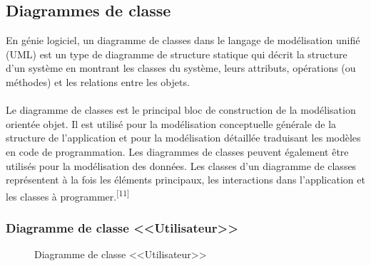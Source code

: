 \documentclass[12pt]{report}
\begin{document}
\newpage

\subsection{Diagrammes de classe}

En génie logiciel, un diagramme de classes dans le langage de modélisation unifié (UML) est un type de diagramme de structure statique qui décrit la structure d'un système en montrant les classes du système, leurs attributs, opérations (ou méthodes) et les relations entre les objets.
\\\\
Le diagramme de classes est le principal bloc de construction de la modélisation orientée objet. Il est utilisé pour la modélisation conceptuelle générale de la structure de l'application et pour la modélisation détaillée traduisant les modèles en code de programmation. Les diagrammes de classes peuvent également être utilisés pour la modélisation des données. Les classes d'un diagramme de classes représentent à la fois les éléments principaux, les interactions dans l'application et les classes à programmer.\textsuperscript{[11]}

\vspace{0.1in}

\subsubsection{Diagramme de classe <<Utilisateur>>}

\vspace{0.1in}

\begin{figure}[h]
\centering
    \centerline{}
    \caption{Diagramme de classe <<Utilisateur>>}
\end{figure}
\end{document}
